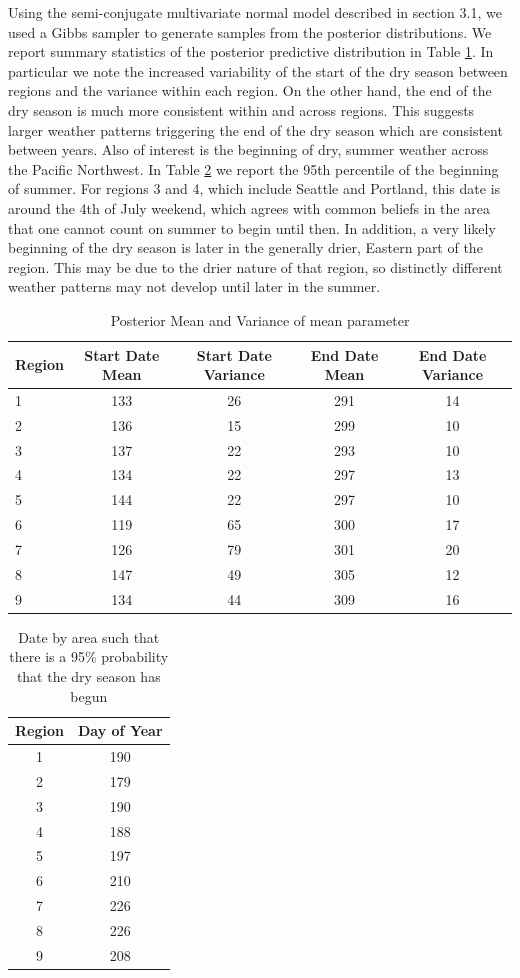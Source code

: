 \documentclass{article}
\begin{document}
Using the semi-conjugate multivariate normal model described in section 3.1, we used a Gibbs sampler to generate samples from the posterior distributions.  We report summary statistics of the posterior predictive distribution in Table \ref{tab:meanparams}.  In particular we note the increased variability of the start of the dry season between regions and the variance within each region.
On the other hand, the end of the dry season is much more consistent within and across regions. This suggests larger weather patterns triggering the end of the dry season which are consistent between years.  
Also of interest is the beginning of dry, summer weather across the Pacific Northwest. In Table \ref{95pctsummer} we report the 95th percentile of the beginning of summer. For regions 3 and 4, which include Seattle and Portland, this date is around the 4th of July weekend, which agrees with common beliefs in the area that one cannot count on summer to begin until then. 
In addition, a very likely beginning of the dry season is later in the generally drier, Eastern part of the region. This may be due to the drier nature of that region, so distinctly different weather patterns may not develop until later in the summer. 

\begin{table}[h!]
\begin{tabular}{|l|c|c|c|c|}
\hline
Region & Start Date Mean & Start Date Variance & End Date Mean & End Date Variance\\
\hline
\hline
1&133&26&291&14\\
2&136&15&299&10\\
3&137&22&293&10\\
4&134&22&297&13\\
5&144&22&297&10\\
6&119&65&300&17\\
7&126&79&301&20\\
8&147&49&305&12\\
9&134&44&309&16\\
\hline
\end{tabular}
\caption{Posterior Mean and Variance of mean parameter}
\label{tab:meanparams}
\end{table}

\begin{table}[h!]
\begin{tabular}{|c|c|}
\hline
Region & Day of Year \\
\hline
\hline
1&190 \\
2&179 \\
3&190 \\
4&188 \\
5&197 \\
6&210\\
 7&226 \\
 8&226 \\
 9&208\\
\hline
\end{tabular}
\caption{Date by area such that there is a 95\% probability that the dry season has begun}
\label{95pctsummer}
\end{table}
\end{document}
